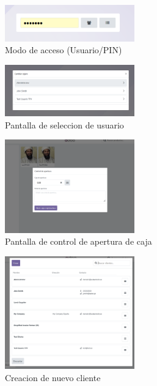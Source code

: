 \documentclass[a4paper,12pt]{article}
\begin{document}
\begin{figure}[h!]
    \centering
    \includegraphics[width=0.5\textwidth]{pr2odoo51-modoAcceso.png}
    \caption{Modo de acceso (Usuario/PIN)}
\end{figure}
\FloatBarrier

\begin{figure}[h!]
    \centering
    \includegraphics[width=0.5\textwidth]{pr2odoo52-escojerCajero.png}
    \caption{Pantalla de seleccion de usuario}
\end{figure}
\FloatBarrier

\begin{figure}[h!]
    \centering
    \includegraphics[width=0.5\textwidth]{pr2odoo53-controlAperturaCaja.png}
    \caption{Pantalla de control de apertura de caja}
\end{figure}
\FloatBarrier

\begin{figure}[h!]
    \centering
    \includegraphics[width=0.5\textwidth]{pr2odoo54-creacionCliente.png}
    \caption{Creacion de nuevo cliente}
\end{figure}
\FloatBarrier
\end{document}
